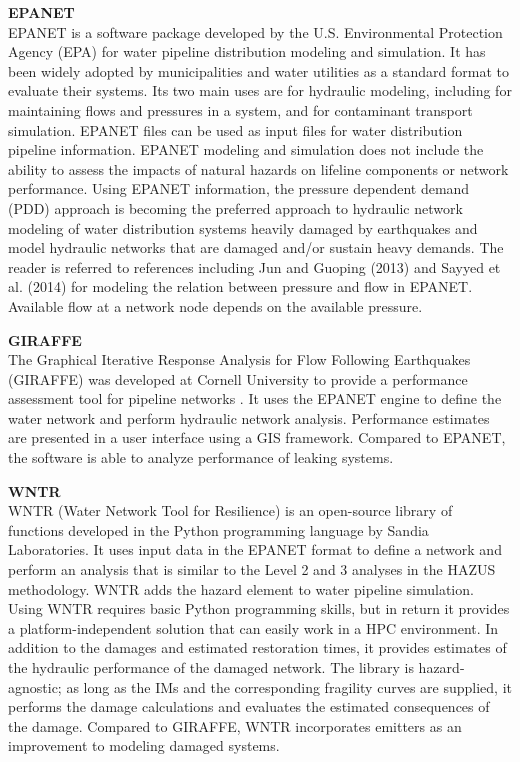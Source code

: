 \noindent\textbf{EPANET} \\EPANET is a software package developed by the U.S. Environmental Protection Agency (EPA) for water pipeline distribution modeling and simulation. It has been widely adopted by municipalities and water utilities as a standard format to evaluate their systems. Its two main uses are for hydraulic modeling, including for maintaining flows and pressures in a system, and for contaminant transport simulation. EPANET files can be used as input files for water distribution pipeline information. EPANET modeling and simulation does not include the ability to assess the impacts of natural hazards on lifeline components or network performance. Using EPANET information, the pressure dependent demand (PDD) approach is becoming the preferred approach to hydraulic network modeling of water distribution systems heavily damaged by earthquakes and model hydraulic networks that are damaged and/or sustain heavy demands. The reader is referred to references including Jun and Guoping (2013) and Sayyed et al. (2014) for modeling the relation between pressure and flow in EPANET. Available flow at a network node depends on the available pressure.
\newline

\noindent\textbf{GIRAFFE} \\The Graphical Iterative Response Analysis for Flow Following Earthquakes (GIRAFFE) was developed at Cornell University to provide a performance assessment tool for pipeline networks \citep{wang2008seismic}. It uses the EPANET engine to define the water network and perform hydraulic network analysis. Performance estimates are presented in a user interface using a GIS framework. Compared to EPANET, the software is able to analyze performance of leaking systems.
\newline

\noindent\textbf{WNTR} \\WNTR (Water Network Tool for Resilience) is an open-source library of functions developed in the Python programming language by Sandia Laboratories. It uses input data in the EPANET format to define a network and perform an analysis that is similar to the Level 2 and 3 analyses in the HAZUS methodology. WNTR adds the hazard element to water pipeline simulation. Using WNTR requires basic Python programming skills, but in return it provides a platform-independent solution that can easily work in a HPC environment. In addition to the damages and estimated restoration times, it provides estimates of the hydraulic performance of the damaged network. The library is hazard-agnostic; as long as the IMs and the corresponding fragility curves are supplied, it performs the damage calculations and evaluates the estimated consequences of the damage. Compared to GIRAFFE, WNTR incorporates emitters as an improvement to modeling damaged systems.
\newline

